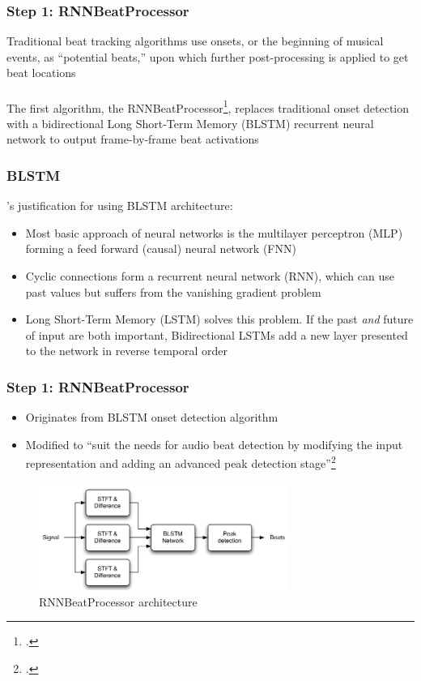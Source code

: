 \documentclass{beamer}
\begin{document}
\begin{frame}
	\frametitle{Step 1: RNNBeatProcessor}
	Traditional beat tracking algorithms use onsets, or the beginning of musical events, as ``potential beats,'' upon which further post-processing is applied to get beat locations\\\ \\
	The first algorithm, the RNNBeatProcessor\footcite{bock1}, replaces traditional onset detection with a bidirectional Long Short-Term Memory (BLSTM) recurrent neural network to output frame-by-frame beat activations
\end{frame}

\begin{frame}
	\frametitle{BLSTM}
	\textcite{bock1}'s justification for using BLSTM architecture:
	\begin{itemize}
		\item
			Most basic approach of neural networks is the multilayer perceptron (MLP) forming a feed forward (causal) neural network (FNN)
		\item
			Cyclic connections form a recurrent neural network (RNN), which can use past values but suffers from the vanishing gradient problem
		\item
			Long Short-Term Memory (LSTM) solves this problem. If the past \textit{and} future of input are both important, Bidirectional LSTMs add a new layer presented to the network in reverse temporal order
	\end{itemize}
\end{frame}


\begin{frame}
	\frametitle{Step 1: RNNBeatProcessor}
	\begin{itemize}
		\item
			Originates from BLSTM onset detection algorithm
		\item
			Modified to ``suit the needs for audio beat detection by modifying the input representation and adding an advanced peak detection stage''\footcite{bock1}
	\end{itemize}
	\begin{figure}
		\includegraphics[height=3.5cm]{./rnnbeat.png}
		\caption{RNNBeatProcessor architecture}
	\end{figure}
\end{frame}
\end{document}

